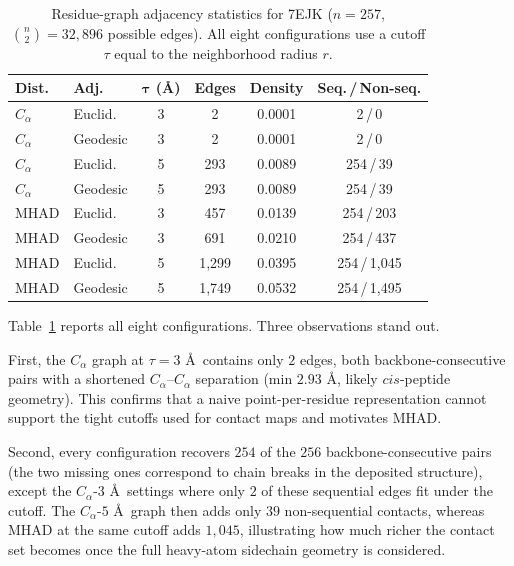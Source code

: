 \documentclass[conference]{IEEEtran}
\begin{document}
\begin{table}[htbp]
\caption{Residue-graph adjacency statistics for 7EJK ($n = 257$, $\binom{n}{2} = 32{,}896$ possible edges). All eight configurations use a cutoff $\tau$ equal to the neighborhood radius $r$.}
\label{tab:graph_constructions}
\begin{center}
\begin{tabular}{|l|l|c|c|c|c|}
\hline
\textbf{Dist.} & \textbf{Adj.} & $\boldsymbol{\tau}$ (\AA) & \textbf{Edges} & \textbf{Density} & \textbf{Seq.\,/\,Non-seq.} \\
\hline
$C_\alpha$ & Euclid.  & 3 & 2     & 0.0001 & 2\,/\,0 \\
$C_\alpha$ & Geodesic & 3 & 2     & 0.0001 & 2\,/\,0 \\
$C_\alpha$ & Euclid.  & 5 & 293   & 0.0089 & 254\,/\,39 \\
$C_\alpha$ & Geodesic & 5 & 293   & 0.0089 & 254\,/\,39 \\
MHAD       & Euclid.  & 3 & 457   & 0.0139 & 254\,/\,203 \\
MHAD       & Geodesic & 3 & 691   & 0.0210 & 254\,/\,437 \\
MHAD       & Euclid.  & 5 & 1{,}299 & 0.0395 & 254\,/\,1{,}045 \\
MHAD       & Geodesic & 5 & 1{,}749 & 0.0532 & 254\,/\,1{,}495 \\
\hline
\end{tabular}
\end{center}
\end{table}

Table~\ref{tab:graph_constructions} reports all eight configurations. Three observations stand out.

First, the $C_\alpha$ graph at $\tau = 3$ \AA\ contains only $2$ edges, both backbone-consecutive pairs with a shortened $C_\alpha$--$C_\alpha$ separation (min $2.93$ \AA, likely $cis$-peptide geometry). This confirms that a naive point-per-residue representation cannot support the tight cutoffs used for contact maps and motivates MHAD.

Second, every configuration recovers $254$ of the $256$ backbone-consecutive pairs (the two missing ones correspond to chain breaks in the deposited structure), except the $C_\alpha$-$3$ \AA\ settings where only $2$ of these sequential edges fit under the cutoff. The $C_\alpha$-$5$ \AA\ graph then adds only $39$ non-sequential contacts, whereas MHAD at the same cutoff adds $1{,}045$, illustrating how much richer the contact set becomes once the full heavy-atom sidechain geometry is considered.
\end{document}
